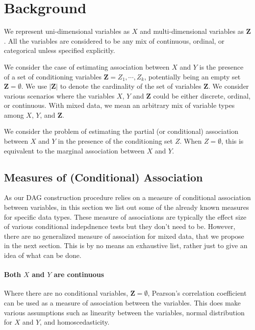 \documentclass[letterpaper]{article} %
\begin{document}
\section{Background}
\label{sec:background}
We represent uni-dimensional variables as $ X $ and multi-dimensional variables
as $ \bm{Z} $. All the variables are considered to be any mix of continuous,
ordinal, or categorical unless specified explicitly.

We consider the case of estimating association between $ X $ and $ Y $ is the
presence of a set of conditioning variables $ \bm{Z} = Z_1, \cdots, Z_k $,
potentially being an empty set $ \bm{Z} = \emptyset $. We use $ \rvert \bm{Z}
\rvert $ to denote the cardinality of the set of variables $ \bm{Z} $. We
consider various scenarios where the variables $ X $, $ Y $ and $ \bm{Z} $
could be either discrete, ordinal, or continuous. With mixed data, we mean an
arbitrary mix of variable types among $ X $, $ Y $, and $ \bm{Z} $.

We consider the problem of estimating the partial (or conditional) association
between $ X $ and $ Y $ in the presence of the conditioning set $ Z $. When $ Z
= \emptyset $, this is equivalent to the marginal association between $ X $ and
$ Y $.


\subsection{Measures of (Conditional) Association}
As our DAG construction procedure relies on a measure of conditional
association between variables, in this section we list out some of the already
known measures for specific data types. These measure of associations are
typically the effect size of various conditional indepdnence tests but they
don't need to be. However, there are no generalized measure of association for
mixed data, that we propose in the next section. This is by no means an
exhaustive list, rather just to give an idea of what can be done.

\paragraph{Both $ X $ and $ Y $ are continuous}
Where there are no conditional variables, $ \bm{Z} = \emptyset $, Pearson's
correlation coefficient can be used as a measure of association between the
variables. This does make various assumptions such as linearity between the
variables, normal distribution for $ X $ and $ Y $, and homoscedasticity.
\end{document}
